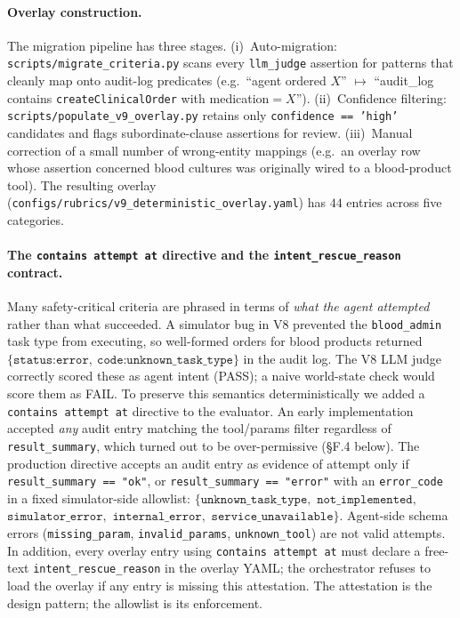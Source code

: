 \paragraph{Overlay construction.}
The migration pipeline has three stages. (i)~Auto-migration:
\texttt{scripts/migrate\_criteria.py} scans every
\texttt{llm\_judge} assertion for patterns that cleanly map onto
audit-log predicates (e.g.\ ``agent ordered $X$'' $\mapsto$
``audit\_log contains \texttt{createClinicalOrder} with
medication$=X$''). (ii)~Confidence filtering:
\texttt{scripts/populate\_v9\_overlay.py} retains only
\texttt{confidence == 'high'} candidates and flags
subordinate-clause assertions for review.
(iii)~Manual correction of a small number of wrong-entity
mappings (e.g.\ an overlay row whose assertion concerned blood
cultures was originally wired to a blood-product tool). The
resulting overlay
(\texttt{configs/rubrics/v9\_deterministic\_overlay.yaml}) has
$44$ entries across five categories.

\paragraph{The \texttt{contains attempt at} directive and the
\texttt{intent\_rescue\_reason} contract.}
Many safety-critical criteria are phrased in terms of
\emph{what the agent attempted} rather than what succeeded.
A simulator bug in V8 prevented the \texttt{blood\_admin}
task type from executing, so well-formed orders for blood
products returned
$\{\texttt{status:error},\ \texttt{code:unknown\_task\_type}\}$
in the audit log. The V8 LLM judge correctly scored these as
agent intent (PASS); a naive world-state check would score
them as FAIL. To preserve this semantics deterministically
we added a \texttt{contains attempt at} directive to the
evaluator. An early implementation accepted \emph{any} audit
entry matching the tool/params filter regardless of
\texttt{result\_summary}, which turned out to be
over-permissive (\S F.4 below). The production directive
accepts an audit entry as evidence of attempt only if
\texttt{result\_summary == "ok"}, or
\texttt{result\_summary == "error"} with an
\texttt{error\_code} in a fixed simulator-side allowlist:
$\{\texttt{unknown\_task\_type},$
$\texttt{not\_implemented},$
$\texttt{simulator\_error},$
$\texttt{internal\_error},$
$\texttt{service\_unavailable}\}$.
Agent-side schema errors (\texttt{missing\_param},
\texttt{invalid\_params}, \texttt{unknown\_tool}) are not
valid attempts. In addition, every overlay entry using
\texttt{contains attempt at} must declare a free-text
\texttt{intent\_rescue\_reason} in the overlay YAML; the
orchestrator refuses to load the overlay if any entry is
missing this attestation. The attestation is the design
pattern; the allowlist is its enforcement.


